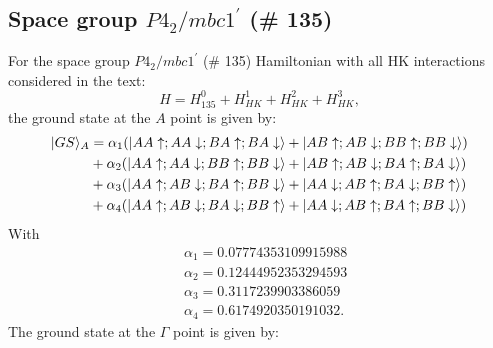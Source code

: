 \documentclass[aps,reprint,notitlepage,onecolumn,12pt]{revtex4-2}
\DeclarePairedDelimiter\ket{\lvert}{\rangle}%
\numberwithin{equation}{section}
\def\sg135{$P4_2/mbc1^\prime$ (\# 135)}
\begin{document}
\subsection{Space group \sg135}
For the space group \sg135 Hamiltonian with all HK interactions considered in the text:
\begin{equation}
    H=H^{0}_{135}+H_{HK}^{1}+H_{HK}^{2}+H_{HK}^{3},
\end{equation}
the ground state at the $A$ point is given by:
\begin{align}
    \ket{GS}_{A}&=\alpha_{1}(\ket{AA\uparrow;AA\downarrow;BA\uparrow;BA\downarrow}+\ket{AB\uparrow;AB\downarrow;BB\uparrow;BB\downarrow}) \nonumber \\
    &+\alpha_{2}(\ket{AA\uparrow;AA\downarrow;BB\uparrow;BB\downarrow}+\ket{AB\uparrow;AB\downarrow;BA\uparrow;BA\downarrow}) \nonumber \\
    &+\alpha_{3}(\ket{AA\uparrow;AB\downarrow;BA\uparrow;BB\downarrow}+\ket{AA\downarrow;AB\uparrow;BA\downarrow;BB\uparrow}) \nonumber \\
    &+\alpha_{4}(\ket{AA\uparrow;AB\downarrow;BA\downarrow;BB\uparrow}+\ket{AA\downarrow;AB\uparrow;BA\uparrow;BB\downarrow}) \nonumber
\end{align}
With
\begin{align}
    &\alpha_{1}=0.07774353109915988 \nonumber \\
    &\alpha_{2}=0.12444952353294593 \nonumber\\
    &\alpha_{3}=0.3117239903386059 \nonumber \\
    &\alpha_{4}=0.6174920350191032 \nonumber.
\end{align}
The ground state at the $\Gamma$ point is given by:
\end{document}
